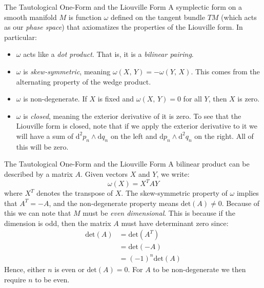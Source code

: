 \documentclass{beamer}
\begin{document}
    \begin{frame}{The Tautological One-Form and the Liouville Form}
        A symplectic form on a smooth manifold $M$ is function
        $\omega$ defined on the
        tangent bundle $TM$ (which acts as our \textit{phase space})
        that axiomatizes the properties of the Liouville form. In particular:
        \begin{itemize}
            \item
                $\omega$ acts like a \textit{dot product}. That is, it is a
                \textit{bilinear pairing}.
            \item
                $\omega$ is \textit{skew-symmetric}, meaning
                $\omega(X,\,Y)=-\omega(Y,\,X)$. This comes from the alternating
                property of the wedge product.
            \item
                $\omega$ is non-degenerate. If $X$ is fixed and
                $\omega(X,\,Y)=0$ for all $Y$, then $X$ is zero.
            \item
                $\omega$ is \textit{closed}, meaning the exterior derivative
                of it is zero. To see that the Liouville form is closed,
                note that if we apply the exterior derivative to it we will
                have a sum of $\textrm{d}^{2}p_{n}\land\textrm{d}q_{n}$ on the
                left and $\textrm{d}p_{n}\land\textrm{d}^{2}q_{n}$ on the
                right. All of this will be zero.
        \end{itemize}
    \end{frame}
    \begin{frame}{The Tautological One-Form and the Liouville Form}
        A bilinear product can be described by a matrix $A$. Given vectors
        $X$ and $Y$, we write:
        \[
            \omega(X)=X^{T}AY
        \]
        where $X^{T}$ denotes the transpose of $X$. The skew-symmetric property
        of $\omega$ implies that $A^{T}=-A$, and the non-degenerate property
        means $\textrm{det}(A)\ne{0}$. Because of this we can note that
        $M$ must be \textit{even dimensional}. This is because if the dimension
        is odd, then the matrix $A$ must have determinant zero since:
        \[
            \begin{aligned}
                \textrm{det}(A)
                &=\textrm{det}(A^{T})\\
                &=\textrm{det}(-A)\\
                &=(-1)^{n}\textrm{det}(A)
            \end{aligned}
        \]
        Hence, either $n$ is even or $\textrm{det}(A)=0$. For $A$ to be
        non-degenerate we then require $n$ to be even.
    \end{frame}
\end{document}

